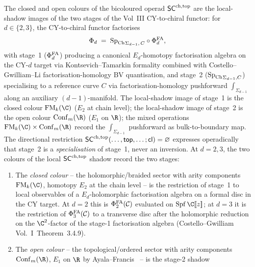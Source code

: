 \begin{lemma}
\label{lem:heptagon-two-stage-CY-to-chiral}%
\label{rem:heptagon-two-stage-CY-to-chiral}%
%
%
The closed and open colours of the bicoloured operad $\mathsf{SC}^{\mathrm{ch},\mathrm{top}}$ are
the local-shadow images of the two stages of the Vol~III CY-to-chiral
functor: for $d \in \{2, 3\}$, the CY-to-chiral functor factorises
\[
 \Phi_d \;=\; {\mathrm{Sp}_{\mathrm{Ch}}}_{\Sigma_{d-1},\,C}\circ\Phi^{\mathrm{FA}}_d,
\]
with stage~1 ($\Phi^{\mathrm{FA}}_d$) producing a canonical $E_d$-homotopy
factorisation algebra on the CY-$d$ target via
Kontsevich--Tamarkin formality combined with
Costello--Gwilliam--Li factorisation-homology BV quantisation, and
stage~2 (${\mathrm{Sp}_{\mathrm{Ch}}}_{\Sigma_{d-1},C}$) specialising to a reference
curve $C$ via factorisation-homology pushforward
$\int_{\Sigma_{d-1}}$ along an auxiliary $(d-1)$-manifold. The
local-shadow image of stage~1 is the closed colour
$\FM_k(\C)$ \textup($E_2$ at chain level\textup); the local-shadow image
of stage~2 is the open colour $\Conf_m(\R)$ \textup($E_1$ on $\R$\textup);
the mixed operations $\FM_k(\C) \times \Conf_m(\R)$ record the
$\int_{\Sigma_{d-1}}$ pushforward as bulk-to-boundary map. The
directional restriction
$\mathsf{SC}^{\mathrm{ch},\mathrm{top}}(\ldots, \mathsf{top}, \ldots; \mathsf{cl}) = \varnothing$
expresses operadically that stage~2 is a \emph{specialisation} of
stage~1, never an inversion.
At $d = 2, 3$, the two colours of the local $\mathsf{SC}^{\mathrm{ch},\mathrm{top}}$ shadow record
the two stages:
\begin{enumerate}[label=\textup{(\roman*)}]
\item The \emph{closed colour} -- the holomorphic/braided sector
with arity components $\FM_k(\C)$, homotopy $E_2$ at the chain
level -- is the restriction of stage~1 to local observables of a
$E_d$-holomorphic factorisation algebra on a formal disc in the
CY target. At $d = 2$ this is $\Phi^{\mathrm{FA}}_2(\mathcal{C})$ evaluated on
$\mathrm{Spf}\,\C[\![z]\!]$; at $d = 3$ it is the restriction of
$\Phi^{\mathrm{FA}}_3(\mathcal{C})$ to a transverse disc after the holomorphic
reduction on the $\C^2$-factor of the stage-1 factorisation
algebra (Costello--Gwilliam Vol.~I~Theorem~3.4.9).
\item The \emph{open colour} -- the topological/ordered sector
with arity components $\Conf_m(\R)$, $E_1$ on $\R$ by
Ayala--Francis~\cite{AF15} -- is the stage-2 shadow

\end{enumerate}
\end{lemma}

